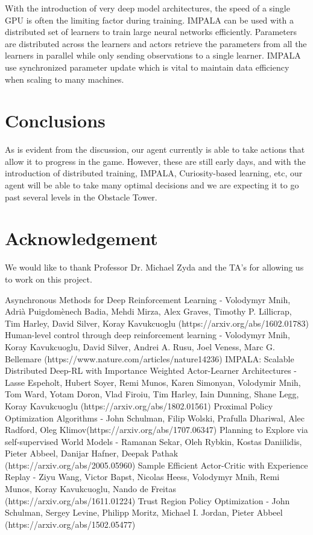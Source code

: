 \documentclass[conference]{IEEEtran}
\begin{document}
With the introduction of very deep model architectures, the speed of a single GPU is often the limiting factor during training. IMPALA can be used with a distributed set of learners to train large neural networks efficiently. Parameters are distributed across the learners and actors retrieve the parameters from all the learners in parallel while only sending observations to a single learner. IMPALA use synchronized parameter update which is vital to maintain data efficiency when scaling to many machines.

\section{Conclusions}

As is evident from the discussion, our agent currently is able to take actions that allow it to progress in the game. However, these are still early days, and with the introduction of distributed training, IMPALA, Curiosity-based learning, etc, our agent will be able to take many optimal decisions and we are expecting it to go past several levels in the Obstacle Tower.

\section{Acknowledgement}

We would like to thank Professor Dr. Michael Zyda and the TA's for allowing us to work on this project.

\begin{thebibliography}{00}
 Asynchronous Methods for Deep Reinforcement Learning - Volodymyr Mnih, Adrià Puigdomènech Badia, Mehdi Mirza, Alex Graves, Timothy P. Lillicrap, Tim Harley, David Silver, Koray Kavukcuoglu (https://arxiv.org/abs/1602.01783)
 Human-level control through deep reinforcement learning - Volodymyr Mnih, Koray Kavukcuoglu, David Silver, Andrei A. Rusu, Joel Veness, Marc G. Bellemare (https://www.nature.com/articles/nature14236)
 IMPALA: Scalable Distributed Deep-RL with Importance Weighted Actor-Learner Architectures - Lasse Espeholt, Hubert Soyer, Remi Munos, Karen Simonyan, Volodymir Mnih, Tom Ward, Yotam Doron, Vlad Firoiu, Tim Harley, Iain Dunning, Shane Legg, Koray Kavukcuoglu (https://arxiv.org/abs/1802.01561)
 Proximal Policy Optimization Algorithms - John Schulman, Filip Wolski, Prafulla Dhariwal, Alec Radford, Oleg Klimov(https://arxiv.org/abs/1707.06347)
 Planning to Explore via self-supervised World Models - Ramanan Sekar, Oleh Rybkin, Kostas Daniilidis, Pieter Abbeel, Danijar Hafner, Deepak Pathak (https://arxiv.org/abs/2005.05960)
 Sample Efficient Actor-Critic with Experience Replay - Ziyu Wang, Victor Bapst, Nicolas Heess, Volodymyr Mnih, Remi Munos, Koray Kavukcuoglu, Nando de Freitas (https://arxiv.org/abs/1611.01224)
 Trust Region Policy Optimization - John Schulman, Sergey Levine, Philipp Moritz, Michael I. Jordan, Pieter Abbeel (https://arxiv.org/abs/1502.05477)
\end{thebibliography}
\vspace{12pt}
\end{document}
